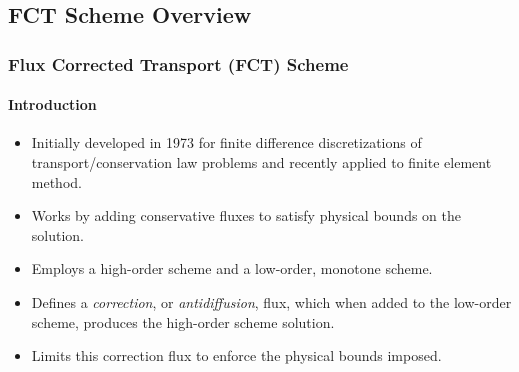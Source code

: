 \documentclass{beamer}
\begin{document}
\subsection{FCT Scheme Overview}
\begin{frame}
\frametitle{Flux Corrected Transport (FCT) Scheme}
\framesubtitle{Introduction}

\begin{itemize}
   \item Initially developed in 1973 for finite difference discretizations of
      transport/conservation law problems and recently applied to finite element
      method.
   \item Works by adding conservative fluxes to satisfy physical bounds on the
      solution.
   \item Employs a high-order scheme and a low-order, monotone scheme.
   \item Defines a \emph{correction}, or \emph{antidiffusion}, flux, which
      when added to the low-order scheme, produces the high-order scheme
      solution.
   \item Limits this correction flux to enforce the physical bounds imposed.
\end{itemize}

\end{frame}
%
\end{document}
